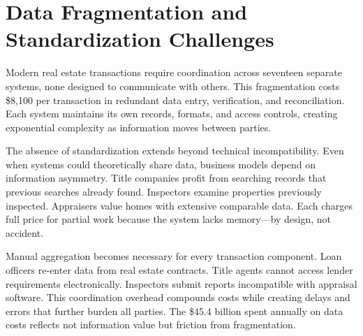 \section{Data Fragmentation and Standardization Challenges}

Modern real estate transactions require coordination across seventeen separate systems, none designed to communicate with others. This fragmentation costs \$8{,}100 per transaction in redundant data entry, verification, and reconciliation. Each system maintains its own records, formats, and access controls, creating exponential complexity as information moves between parties.

The absence of standardization extends beyond technical incompatibility. Even when systems could theoretically share data, business models depend on information asymmetry. Title companies profit from searching records that previous searches already found. Inspectors examine properties previously inspected. Appraisers value homes with extensive comparable data. Each charges full price for partial work because the system lacks memory—by design, not accident.

Manual aggregation becomes necessary for every transaction component. Loan officers re-enter data from real estate contracts. Title agents cannot access lender requirements electronically. Inspectors submit reports incompatible with appraisal software. This coordination overhead compounds costs while creating delays and errors that further burden all parties. The \$45.4 billion spent annually on data costs reflects not information value but friction from fragmentation.

